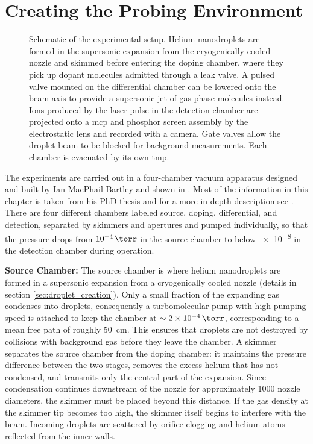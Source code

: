 \section{Creating the Probing Environment}
\begin{figure}[htbp]
  \centering
    
  \caption[]{Schematic of the experimental setup. Helium nanodroplets are formed in the supersonic expansion from the cryogenically cooled nozzle and skimmed before entering the doping chamber, where they pick up dopant molecules admitted through a leak valve. A pulsed valve mounted on the differential chamber can be lowered onto the beam axis to provide a supersonic jet of gas-phase molecules instead. Ions produced by
  the laser pulse in the detection chamber are projected onto a \gls{mcp} and phosphor screen assembly by the electrostatic lens and recorded with a camera. Gate valves allow the droplet beam to be blocked for background measurements. Each chamber is evacuated by its own \gls{tmp}.}
  \label{fig:setup}
\end{figure}

The experiments are carried out in a four-chamber vacuum apparatus designed and built by Ian MacPhail-Bartley and shown in . Most of the information in this chapter is taken from his PhD thesis  and for a more in depth description see \cite{ianThesis}.  There are four different chambers labeled source, doping, differential, and detection, separated by skimmers and apertures and pumped individually, so that the pressure drops from $\SI{e-4}{\torr}$ in the source chamber to below \SI{e-8}{\torr} in the detection chamber during operation.

\textbf{Source Chamber:} The source chamber is where helium nanodroplets are formed in a supersonic expansion from a cryogenically cooled nozzle (details in section \ref{sec:droplet_creation}). Only a small fraction of the expanding gas condenses into droplets, consequently a turbomolecular pump with high pumping speed is attached to keep the chamber at $\sim\SI{2e-4}{\torr}$, corresponding to a mean free path of roughly \SI{50}{\centi\metre}. This ensures that droplets are not destroyed by collisions with background gas before they leave the chamber. A skimmer separates the source chamber from the doping chamber: it maintains the pressure difference between the two stages, removes the excess helium that has not condensed, and transmits only the central part of the expansion. Since condensation continues downstream of the nozzle for approximately 1000 nozzle diameters, the skimmer must be placed beyond this distance. If the gas density at the skimmer tip becomes too high, the skimmer itself begins to interfere with the beam. Incoming droplets are scattered by orifice clogging and helium atoms reflected from the inner walls.

